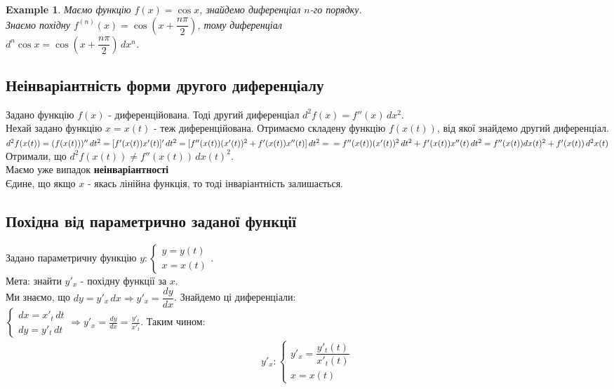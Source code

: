 \documentclass[a4paper, 14pt]{article}
\theoremstyle{theoremdd}
\theoremstyle{theoremdd}
\theoremstyle{theoremdd}
\theoremstyle{theoremdd}
\newtheorem{example}[theorem]{Example}
\theoremstyle{theoremdd}
\theoremstyle{theoremdd}
\theoremstyle{theoremdd}
\theoremstyle{theoremdd}
\begin{document}
\begin{example}
Маємо функцію $f(x) = \cos x$, знайдемо диференціал $n$-го порядку.\\
Знаємо похідну $f^{(n)}(x) = \cos \left(x + \dfrac{n \pi}{2} \right)$, тому диференціал\\
$d^n \cos x = \cos \left(x + \dfrac{n \pi}{2} \right) \,dx^n$.
\end{example}

\subsection{Неінваріантність форми другого диференціалу}
Задано функцію $f(x)$ - диференційована. Тоді другий диференціал $d^2f(x) = f''(x)\,dx^2$.\\
Нехай задано функцію $x = x(t)$ - теж диференційована. Отримаємо складену функцію $f(x(t))$, від якої знайдемо другий диференціал.\\
$d^2 f(x(t)) = (f(x(t)))'' \,dt^2 = [f'(x(t))x'(t)]'\,dt^2 = [f''(x(t))(x'(t))^2 + f'(x(t))x''(t)]\,dt^2 = \\ 
= f''(x(t))(x'(t))^2\,dt^2 + f'(x(t))x''(t)\,dt^2 = f''(x(t)) dx(t)^2 + f'(x(t))\,d^2 x(t)$\\
Отримали, що $d^2f(x(t)) \neq f''(x(t))\,dx(t)^2$.\\
Маємо уже випадок \textbf{неінваріантності} \\ Єдине, що якщо $x$ - якась лінійна функція, то тоді інваріантність залишається.

\subsection{Похідна від параметрично заданої функції}
Задано параметричну функцію $y: \begin{cases} y = y(t) \\ x = x(t) \end{cases}$.\\
Мета: знайти $y'_x$ - похідну функції за $x$.\\
Ми знаємо, що $dy = y'_x \,dx \Rightarrow y'_x = \dfrac{dy}{dx}$. Знайдемо ці диференціали:\\
$\begin{cases} dx = x'_t\,dt \\ dy = y'_t\,dt \end{cases} \Rightarrow \displaystyle y'_x = \frac{dy}{dx} = \frac{y'_t}{x'_t}$. Таким чином:
\begin{align*}
y'_x: \begin{cases} y'_x = \dfrac{y'_t(t)}{x'_t(t)} \\ x = x(t) \end{cases}
\end{align*}
\end{document}
